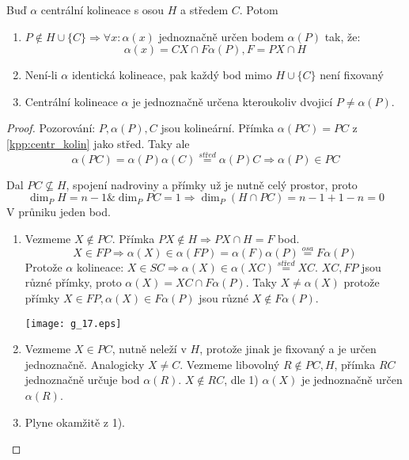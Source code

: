\begin{lemma}\label{kpp:centr_kolin_prop}
    Buď $\alpha$ centrální kolineace s osou $H$ a středem $C$. Potom
    \begin{enumerate}
        \item $P\not\in H\cup\{C\}\Rightarrow \forall x: \alpha(x)$ jednoznačně určen bodem $\alpha(P)$ tak, že:
		\[ \alpha(x)=CX\cap F\alpha(P), F=PX\cap H \]
        \item Není-li $\alpha$ identická kolineace, pak každý bod mimo $H\cup \{C\}$ není fixovaný
        \item Centrální kolineace $\alpha$ je jednoznačně určena kteroukoliv dvojicí $P\neq\alpha(P)$.
    \end{enumerate}
\end{lemma}
\begin{proof}
	Pozorování: $P, \alpha(P), C$ jsou kolineární.
	Přímka $\alpha(PC) = PC$ z \cref{kpp:centr_kolin} jako střed.
	Taky ale
	\[ \alpha(PC) = \alpha(P)\alpha(C) \stackrel{střed}{=} \alpha(P) C \Rightarrow \alpha(P) \in PC \]

	Dal $PC \nsubseteq H$, spojení nadroviny a přímky už je nutně celý prostor, proto
	\[ \dim_P H = n - 1 \& \dim_P PC = 1 \Rightarrow \dim_P (H \cap PC) = n - 1 + 1 - n = 0 \]
	V průniku jeden bod.

    \begin{enumerate}
	    \item Vezmeme $X \notin PC$.
		    Přímka $PX \notin H \Rightarrow PX \cap H = F$ bod.
		    \[ X \in FP \Rightarrow \alpha(X) \in \alpha(FP) = \alpha(F)\alpha(P) \stackrel{osa}{=} F\alpha(P) \]
		    Protože $\alpha$ kolineace: $X \in SC \Rightarrow \alpha(X) \in \alpha(XC) \stackrel{střed}{=} XC$.
		    $XC, FP$ jsou různé přímky, proto $\alpha(X) = XC \cap F\alpha(P)$.
		    Taky $X \ne \alpha(X)$ protože přímky $X \in FP, \alpha(X) \in F\alpha(P)$ jsou různé $X \notin F\alpha(P)$.

    	\texttt{[image: g\_17.eps]}
\item Vezmeme $X \in PC$, nutně neleží v $H$, protože jinak je fixovaný a je určen jednoznačně.
	Analogicky $X \ne C$.
	Vezmeme libovolný $R \notin PC, H$, přímka $RC$ jednoznačně určuje bod $\alpha(R)$.
	$X \notin RC$, dle 1) $\alpha(X)$ je jednoznačně určen $\alpha(R)$.

	\item Plyne okamžitě z 1).
    \end{enumerate}
\end{proof}

